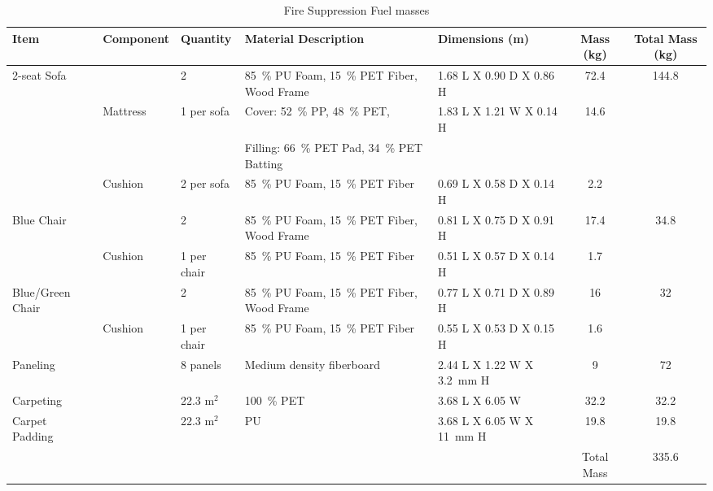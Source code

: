 \documentclass[12pt,oneside]{book}
\begin{document}
\begin{table}
	\centering
	\scriptsize
	\caption{Fire Suppression Fuel masses}
	\renewcommand{\tabcolsep}{1pt}
	\begin{tabular}{lllllcc}
		\toprule[1.5pt]
		Item               & Component		& Quantity		&  Material Description             			&  Dimensions (m)            	&  Mass (kg)  		& Total Mass (kg) \\
		\midrule
		2-seat Sofa        &				& 2				& 85~\% PU Foam, 15~\% PET Fiber, Wood Frame 	&  1.68 L X 0.90 D X 0.86 H  	&  72.4    			& 144.8 \\
		           	 	   & Mattress	    & 1 per sofa	& Cover: 52~\% PP, 48~\% PET,                   &  1.83 L X 1.21 W X 0.14 H     &  14.6             & \\
		           	 	   &                &               & Filling: 66~\% PET Pad, 34~\% PET Batting     &                               &                   & \\
			           	   & Cushion    	& 2 per sofa	& 85~\% PU Foam, 15~\% PET Fiber   				&  0.69 L X 0.58 D X 0.14 H  	&  2.2     			& \\
		Blue Chair         &				& 2				& 85~\% PU Foam, 15~\% PET Fiber, Wood Frame   	&  0.81 L X 0.75 D X 0.91 H  	&  17.4    			& 34.8 \\
		    			   & Cushion        & 1 per chair   & 85~\% PU Foam, 15~\% PET Fiber				&  0.51 L X 0.57 D X 0.14 H  	&  1.7    			& \\
		Blue/Green Chair   & 				& 2				& 85~\% PU Foam, 15~\% PET Fiber, Wood Frame    &  0.77 L X 0.71 D X 0.89 H  	&  16    			& 32 \\
		                   & Cushion    	& 1 per chair	& 85~\% PU Foam, 15~\% PET Fiber		        &  0.55 L X 0.53 D X 0.15 H  	&  1.6    			& \\
		Paneling           &				& 8 panels		& Medium density fiberboard                     &  2.44 L X 1.22 W X 3.2~mm H   &  9    			& 72 \\
		Carpeting          &				& 22.3 m$^2$	& 100~\% PET                  					&  3.68 L X 6.05 W  			&  32.2				& 32.2 \\
		Carpet Padding     &				& 22.3 m$^2$	& PU                       	 				    &  3.68 L X 6.05 W X 11~mm H    &  19.8			    & 19.8 \\
		                   &                &               &                                               &                               & Total Mass        & 335.6 \\
		\bottomrule[1.25pt]
	\end{tabular}
	\label{tab:Fire_Suppression_Fuel_Masses}
\end{table}
\end{document}
